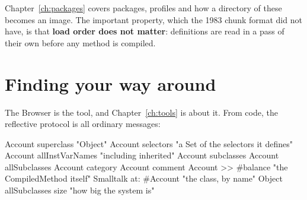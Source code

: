 Chapter~\ref{ch:packages} covers packages, profiles and how a directory of
these becomes an image. The important property, which the 1983 chunk format
did not have, is that \textbf{load order does not matter}: definitions are
read in a pass of their own before any method is compiled.

\section{Finding your way around}

The Browser is the tool, and Chapter~\ref{ch:tools} is about it. From code,
the reflective protocol is all ordinary messages:

\begin{st}
Account superclass                   "Object"
Account selectors                    "a Set of the selectors it defines"
Account allInstVarNames              "including inherited"
Account subclasses
Account allSubclasses
Account category
Account comment
Account >> #balance                  "the CompiledMethod itself"
Smalltalk at: #Account               "the class, by name"
Object allSubclasses size            "how big the system is"
\end{st}
